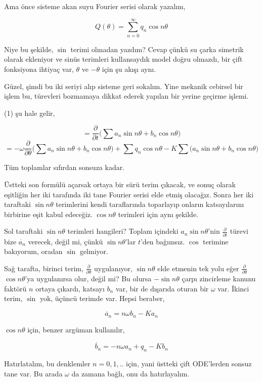 \documentclass[12pt,fleqn]{article}\usepackage{../../common}
\begin{document}
Ama önce sisteme akan suyu Fourier serisi olarak yazalım, 

$$ 
Q(\theta) = \sum_{n=0}^{\infty} q_n \cos n\theta
$$

Niye bu şekilde, $\sin$ terimi olmadan yazdım?  Cevap çünkü su çarka
simetrik olarak ekleniyor ve sinüs terimleri kullansaydık model doğru
olmazdı, bir çift fonksiyona ihtiyaç var, $\theta$ ve $-\theta$ için şu
akışı aynı. 

Güzel, şimdi bu iki seriyi alıp sisteme geri sokalım. Yine mekanik cebirsel
bir işlem bu, türevleri bozmamaya dikkat ederek yapılan bir yerine geçirme
işlemi.

(1) şu hale gelir, 

$$ 
= \frac{\partial }{\partial t} \bigg(
\sum a_n \sin n\theta + b_n \cos n\theta 
\bigg) 
$$
$$ = 
- \omega \frac{\partial }{\partial \theta} 
\bigg( \sum a_n \sin n\theta + b_n \cos n\theta \bigg) + 
\sum  q_n \cos n\theta - 
K \sum \big( a_n \sin n\theta + b_n \cos n\theta \big)
$$

Tüm toplamlar sıfırdan sonsuza kadar. 

Üstteki son formülü açarsak ortaya bir sürü terim çıkacak, ve sonuç olarak
eşitliğin her iki tarafında iki tane Fourier serisi elde etmiş
olacağız. Sonra her iki taraftaki $\sin n\theta$ terimlerini kendi
taraflarında toparlayıp onların katsayılarını birbirine eşit kabul
edeceğiz. $\cos n\theta$ terimleri için aynı şekilde.

Sol taraftaki $\sin n\theta$ terimleri hangileri? Toplam içindeki
$a_n \sin n\theta $'nin $\frac{\partial }{\partial t}$ türevi bize
$\dot{a_n}$ verecek, değil mi, çünkü $\sin n\theta$'lar $t$'den
bağımsız. $\cos$ terimine bakıyorum, oradan $\sin$ gelmiyor.

Sağ tarafta, birinci terim, $\frac{\partial }{\partial \theta}$
uygulanıyor, $\sin n\theta$ elde etmenin tek yolu eğer
$\frac{\partial }{\partial \theta}$ $\cos n\theta$'ya uygulanırsa olur,
değil mi? Bu olursa $-\sin n\theta$ çarpı zincirleme kanunu faktörü $n$
ortaya çıkardı, katsayı $b_n$ var, bir de dışarıda oturan bir $\omega$
var. İkinci terim, $\sin$ yok, üçüncü terimde var. Hepsi beraber,

$$ 
\dot{a_n} = n \omega b_n - K a_n 
$$

$\cos n\theta$ için, benzer argüman kullanılır, 

$$ 
\dot{b_n} = -n \omega a_n + q_n - K b_n 
$$

Hatırlatalım, bu denklemler $n = 0,1,..$ için, yani üstteki çift ODE'lerden
sonsuz tane var. Bu arada $\omega$ da zamana bağlı, onu da hatırlayalım.
\end{document}
